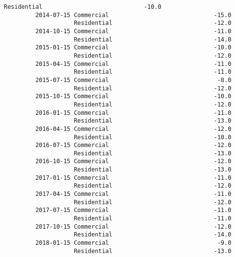 \documentclass[11pt]{article}
\begin{document}
\begin{Verbatim}[commandchars=\\\{\}]
                    Residential                             -10.0   
         2014-07-15 Commercial                              -15.0   
                    Residential                             -12.0   
         2014-10-15 Commercial                              -11.0   
                    Residential                             -14.0   
         2015-01-15 Commercial                              -10.0   
                    Residential                             -12.0   
         2015-04-15 Commercial                              -11.0   
                    Residential                             -11.0   
         2015-07-15 Commercial                               -8.0   
                    Residential                             -12.0   
         2015-10-15 Commercial                              -10.0   
                    Residential                             -12.0   
         2016-01-15 Commercial                              -11.0   
                    Residential                             -13.0   
         2016-04-15 Commercial                              -12.0   
                    Residential                             -10.0   
         2016-07-15 Commercial                              -12.0   
                    Residential                             -13.0   
         2016-10-15 Commercial                              -12.0   
                    Residential                             -13.0   
         2017-01-15 Commercial                              -11.0   
                    Residential                             -12.0   
         2017-04-15 Commercial                              -11.0   
                    Residential                             -12.0   
         2017-07-15 Commercial                              -11.0   
                    Residential                             -11.0   
         2017-10-15 Commercial                              -12.0   
                    Residential                             -14.0   
         2018-01-15 Commercial                               -9.0   
                    Residential                             -13.0   
         

\end{Verbatim}
\end{document}
